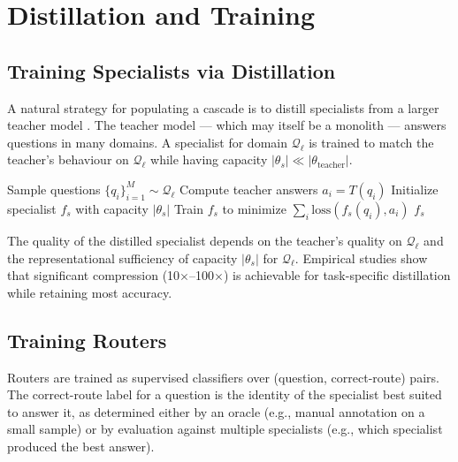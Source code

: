 \documentclass[11pt,a4paper]{article}
\theoremstyle{definition}
\theoremstyle{remark}
\begin{document}
\section{Distillation and Training}
\label{sec:distillation}

\subsection{Training Specialists via Distillation}

A natural strategy for populating a cascade is to distill specialists from a larger teacher model \citep{hinton2015distilling}. The teacher model --- which may itself be a monolith --- answers questions in many domains. A specialist for domain $\mathcal{Q}_\ell$ is trained to match the teacher's behaviour on $\mathcal{Q}_\ell$ while having capacity $|\theta_s| \ll |\theta_{\text{teacher}}|$.

\begin{algorithm}
\caption{Specialist Distillation}
\label{alg:distill}
\begin{algorithmic}[1]
    \State Sample questions $\{q_i\}_{i=1}^M \sim \mathcal{Q}_\ell$
    \State Compute teacher answers $a_i = T(q_i)$
    \State Initialize specialist $f_s$ with capacity $|\theta_s|$
    \State Train $f_s$ to minimize $\sum_i \mathrm{loss}(f_s(q_i), a_i)$
    \State \Return $f_s$
\EndFunction
\end{algorithmic}
\end{algorithm}

The quality of the distilled specialist depends on the teacher's quality on $\mathcal{Q}_\ell$ and the representational sufficiency of capacity $|\theta_s|$ for $\mathcal{Q}_\ell$. Empirical studies \citep{sanh2019distilbert, jiao2020tinybert} show that significant compression (10$\times$--100$\times$) is achievable for task-specific distillation while retaining most accuracy.

\subsection{Training Routers}

Routers are trained as supervised classifiers over (question, correct-route) pairs. The correct-route label for a question is the identity of the specialist best suited to answer it, as determined either by an oracle (e.g., manual annotation on a small sample) or by evaluation against multiple specialists (e.g., which specialist produced the best answer).
\end{document}
